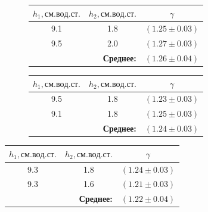 \documentclass[a4paper, 12pt]{article}
\begin{document}
			\begin{figure}[ht!]
				\begin{minipage}[c]{.49\linewidth}
					\centering
					\begin{tabular}{|c|c|c|}
						\hline

						$h_1, см.вод.ст.$ & $h_2, см.вод.ст.$ & $\gamma$\\ \hline
						9.1 & 1.8 & $(1.25 \pm 0.03)$\\ \hline
						9.5 & 2.0 & $(1.27 \pm 0.03)$\\ \hline
						\multicolumn{2}{|r|}{\textbf{Среднее:}} & $\boldsymbol{(1.26 \pm 0.04)}$ \\ \hline

					\end{tabular}
					\label{table:gamma_4}

				\end{minipage} \hfill
				\begin{minipage}[c]{.49\linewidth}
					\centering
					\begin{tabular}{|c|c|c|}
						\hline

						$h_1, см.вод.ст.$ & $h_2, см.вод.ст.$ & $\gamma$\\ \hline
						9.5 & 1.8 & $(1.23 \pm 0.03)$\\ \hline
						9.1 & 1.8 & $(1.25 \pm 0.03)$\\ \hline
						\multicolumn{2}{|r|}{\textbf{Среднее:}} & $\boldsymbol{(1.24 \pm 0.03)}$ \\ \hline

					\end{tabular}
					\label{table:gamma_5}
				\end{minipage}
			\end{figure}

			\begin{table}[!ht]
				\centering
				\begin{tabular}{|c|c|c|}
					\hline

					$h_1, см.вод.ст.$ & $h_2, см.вод.ст.$ & $\gamma$\\ \hline
					9.3 & 1.8 & $(1.24 \pm 0.03)$\\ \hline
					9.3 & 1.6 & $(1.21 \pm 0.03)$\\ \hline
					\multicolumn{2}{|r|}{\textbf{Среднее:}} & $\boldsymbol{(1.22 \pm 0.04)}$ \\ \hline

				\end{tabular}
				\label{table:gamma_6}
			\end{table}
\end{document}
